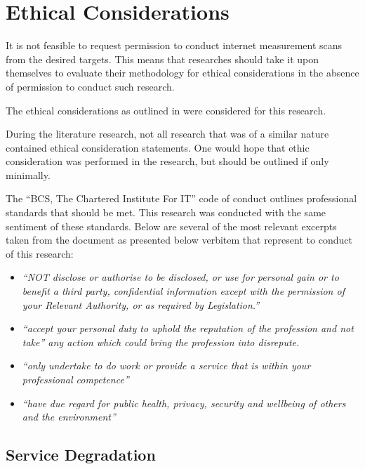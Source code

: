 \documentclass{mscreport}
\begin{document}
\section{Ethical Considerations}
\label{section:ethics}

It is not feasible to request permission to conduct internet measurement scans from the desired targets. This means that researches should take it upon themselves to evaluate their methodology for ethical considerations in the absence of permission to conduct such research.

\vspace{0.3cm} \noindent
The ethical considerations as outlined in \cite{Amann2017-co,Partridge2016-ph,Durumeric2015-zq,Kumar2017-qw} were considered for this research.

\vspace{0.3cm} \noindent
During the literature research, not all research that was of a similar nature contained ethical consideration statements. One would hope that ethic consideration was performed in the research, but should be outlined if only minimally.

\vspace{0.3cm} \noindent
The ``BCS, The Chartered Institute For IT'' code of conduct \cite{Bcs2011-rj} outlines professional standards that should be met. This research was conducted with the same sentiment of these standards. Below are several of the most relevant excerpts taken from the document as presented below verbitem that represent to conduct of this research:
\begin{itemize}
	\setlength\itemsep{0.1em}
	\item \textit{``NOT disclose or authorise to be disclosed, or use for personal gain or to benefit a third party, confidential information except with the permission of your Relevant Authority, or as required by Legislation.''}
	\item \textit{``accept your personal duty to uphold the reputation of the profession and not take''
any action which could bring the profession into disrepute.}
	\item \textit{``only undertake to do work or provide a service that is within your professional
competence''}
	\item \textit{``have due regard for public health, privacy, security and wellbeing of others and
the environment''}
\end{itemize}

\subsection{Service Degradation}
\end{document}
